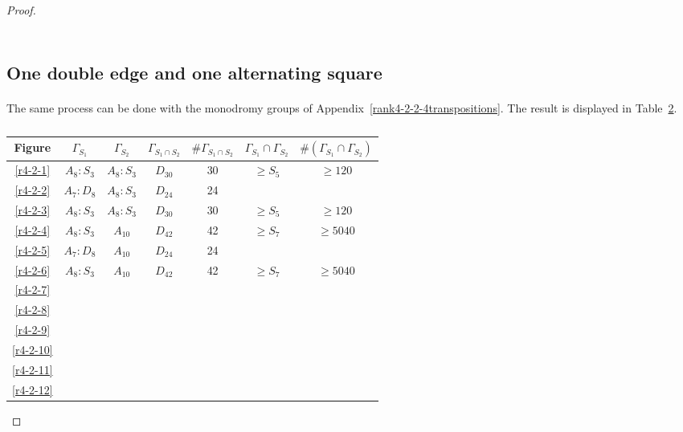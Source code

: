\begin{proof}
\begin{table}
\begin{tabular}{|c|c|c|c|c|c|c|}
  \end{tabular}
  \caption{}
  \label{results-2-1}
\end{table}

\subsection{One double edge and one alternating square}

  \paragraph{}
  The same process can be done with the monodromy groups of Appendix~\ref{rank4-2-2-4transpositions}. The result is displayed in Table~\ref{results-2-2}.

  \begin{table}
    \centering
    \begin{tabular}{|c|c|c|c|c|c|c|}
      \hline
      Figure & $\Gamma_{S_1}$ & $\Gamma_{S_2}$ & $\Gamma_{S_1 \cap S_2}$ & $\#\Gamma_{S_1 \cap S_2}$ & $\Gamma_{S_1} \cap \Gamma_{S_2}$ & $\#(\Gamma_{S_1} \cap \Gamma_{S_2})$ \\ \hline

      \ref{r4-2-1} & $A_8 : S_3$ & $A_8 : S_3 $ & $D_{30}$ & 30 & $\ge S_5$ & $\ge 120$ \\ \hline
      \ref{r4-2-2} & $A_7 : D_8$ & $A_8 : S_3$ & $D_{24}$ & 24 & & \\ \hline
      \ref{r4-2-3} & $A_8 : S_3$ & $A_8 : S_3 $ & $D_{30}$ & 30 & $\ge S_5$ & $\ge 120$ \\ \hline
      \ref{r4-2-4} & $A_8 : S_3$ & $A_{10}$ & $D_{42}$ & 42 & $\ge S_7$ & $\ge 5040$ \\ \hline
      \ref{r4-2-5} & $A_7 : D_8$ & $A_{10}$ & $D_{24}$ & 24 & & \\ \hline
      \ref{r4-2-6} & $A_8 : S_3$ & $A_{10}$ & $D_{42}$ & 42 & $\ge S_7$ & $\ge 5040$ \\ \hline
      \ref{r4-2-7} & \\ \hline
      \ref{r4-2-8} & \\ \hline
      \ref{r4-2-9} & \\ \hline
      \ref{r4-2-10} & \\ \hline
      \ref{r4-2-11} & \\ \hline
      \ref{r4-2-12} & \\ \hline 
        \end{tabular}
    \caption{}
    \label{results-2-2}
  \end{table}


\end{proof}
